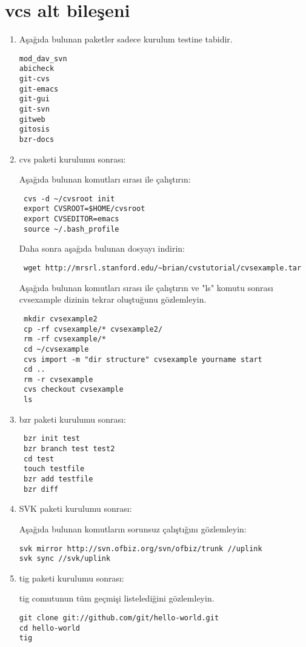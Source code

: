 \documentclass[a4paper,10pt]{article}
\begin{document}
\section{vcs alt bileşeni}
\begin{enumerate}
\item Aşağıda bulunan paketler sadece kurulum testine tabidir.
\begin{verbatim}
mod_dav_svn
abicheck
git-cvs
git-emacs
git-gui
git-svn
gitweb
gitosis
bzr-docs
\end{verbatim}

\item cvs paketi kurulumu sonrası:

Aşağıda bulunan komutları sırası ile çalıştırın:
\begin{verbatim}
 cvs -d ~/cvsroot init
 export CVSROOT=$HOME/cvsroot
 export CVSEDITOR=emacs
 source ~/.bash_profile
\end{verbatim}

Daha sonra aşağıda bulunan dosyayı indirin:
\begin{verbatim}
 wget http://mrsrl.stanford.edu/~brian/cvstutorial/cvsexample.tar
\end{verbatim}

Aşağıda bulunan komutları sırası ile çalıştırın ve "ls" komutu sonrası cvsexample dizinin tekrar oluştuğunu gözlemleyin.
\begin{verbatim}
 mkdir cvsexample2
 cp -rf cvsexample/* cvsexample2/
 rm -rf cvsexample/* 
 cd ~/cvsexample
 cvs import -m "dir structure" cvsexample yourname start 
 cd ..
 rm -r cvsexample 
 cvs checkout cvsexample 
 ls
\end{verbatim}

\item bzr paketi kurulumu sonrası:
\begin{verbatim}
 bzr init test
 bzr branch test test2
 cd test
 touch testfile
 bzr add testfile
 bzr diff
\end{verbatim}

\item SVK paketi kurulumu sonrası:

Aşağıda bulunan komutların sorunsuz çalıştığını gözlemleyin:
\begin{verbatim}
svk mirror http://svn.ofbiz.org/svn/ofbiz/trunk //uplink
svk sync //svk/uplink
\end{verbatim}


\item tig paketi kurulumu sonrası:

tig comutunun tüm geçmişi listelediğini gözlemleyin.
\begin{verbatim}
git clone git://github.com/git/hello-world.git 
cd hello-world
tig
\end{verbatim}



\end{enumerate}
\end{document}
